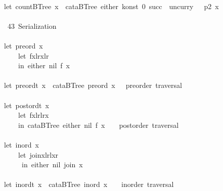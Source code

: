\documentclass[a4paper]{article}
\begin{document}
\begin{tabbing}
\ttfamily ~\\
\ttfamily ~let~countBTree~x~~cataBTree~either~konst~0~succ~~uncurry~~~p2~x\\
\ttfamily ~\\
\ttfamily ~~43~Serialization~\\
\ttfamily ~\\
\ttfamily ~let~preord~x~~\\
\ttfamily ~~~~~let~fxlrxlr\\
\ttfamily ~~~~~in~either~nil~f~x\\
\ttfamily ~\\
\ttfamily ~let~preordt~x~~cataBTree~preord~x~~~preorder~traversal\\
\ttfamily ~\\
\ttfamily ~let~postordt~x~~\\
\ttfamily ~~~~~let~fxlrlrx\\
\ttfamily ~~~~~in~cataBTree~either~nil~f~x~~~~postorder~traversal\\
\ttfamily ~\\
\ttfamily ~let~inord~x~~\\
\ttfamily ~~~~~let~joinxlrlxr\\
\ttfamily ~~~~~~in~either~nil~join~x\\
\ttfamily ~\\
\ttfamily ~let~inordt~x~~cataBTree~inord~x~~~~inorder~traversal\\

\end{tabbing}
\end{document}
